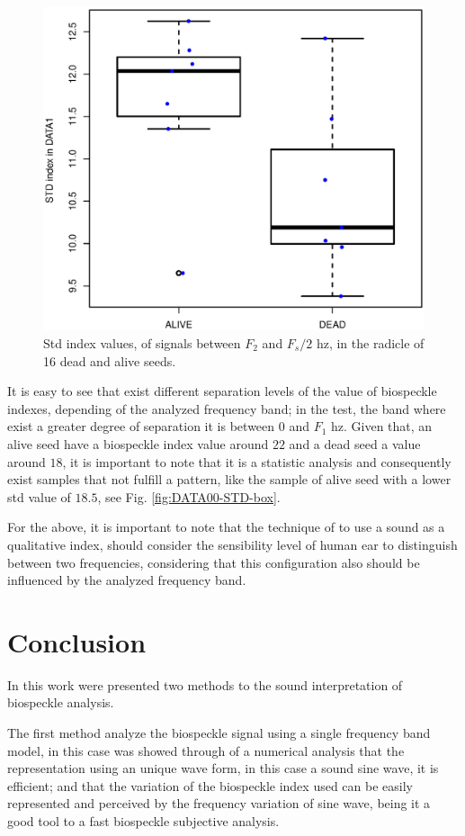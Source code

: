 \documentclass[review]{elsarticle}
\begin{document}
\begin{figure}[ht!]
\centering
\includegraphics[width=0.6\columnwidth]{DATA1-STD-box.eps}
\caption{Std index values, of signals between $F_2$ and $F_s/2$ hz, in the radicle of 16 dead and alive seeds.}
\label{fig:DATA1-STD-box}
\end{figure}

It is easy to see that exist different separation levels of the value of biospeckle indexes, depending
of the analyzed frequency band; in the test, the band where exist a greater degree of separation it
is between $0$ and $F_1$ hz. Given that, an alive seed have a biospeckle index value around $22$
and a dead seed a value around $18$, it is important to note that it is a statistic analysis
and consequently exist samples that not fulfill a pattern, like the sample of alive seed
with a lower std value of $18.5$, see Fig. \ref{fig:DATA00-STD-box}. 

For the above, it is important to note that the technique of to use a sound as
a qualitative index, should consider the sensibility level of human ear
to distinguish between two frequencies, considering that this configuration
also should be influenced by the analyzed frequency band.

\section{Conclusion} 

In this work were presented two  methods to the sound interpretation of biospeckle analysis.

The first method analyze the biospeckle signal using a single frequency band model, 
in this case was showed through of a numerical analysis that the representation 
using an unique wave form, in this case a sound sine wave, it is efficient; and that the variation
of the biospeckle index used can be easily represented and perceived by the frequency variation of sine wave,
being it a good tool to a fast  biospeckle subjective  analysis.
\end{document}
